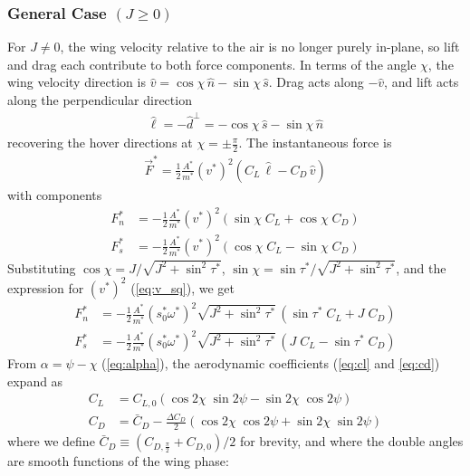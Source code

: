 \documentclass[11pt,letterpaper]{article}
\begin{document}
\subsubsection{General Case $(J \geq 0)$}

For $J \neq 0$, the wing velocity relative to the air is no longer
purely in-plane, so lift and drag each contribute to both force
components. In terms of the angle $\chi$, the wing velocity direction
is $\hat{v} = \cos\chi\, \hat{n} - \sin\chi\, \hat{s}$. Drag acts
along $-\hat{v}$, and lift acts along the perpendicular direction
\begin{align}
    \hat{\ell} = -\hat{d}^\perp = -\cos\chi\, \hat{s} - \sin\chi\, \hat{n}
\end{align}
recovering the hover directions at $\chi = \pm\frac{\pi}{2}$.
The instantaneous force is
\begin{align}
    \vec{F}^* = \frac12 \frac{A^*}{m^*} (v^*)^2 \left( C_L\, \hat{\ell} - C_D\, \hat{v} \right)
\end{align}
with components
\begin{align}
    F^*_n &= -\frac12 \frac{A^*}{m^*} (v^*)^2 \left( \sin\chi\; C_L + \cos\chi\; C_D \right) \\
    F^*_s &= -\frac12 \frac{A^*}{m^*} (v^*)^2 \left( \cos\chi\; C_L - \sin\chi\; C_D \right)
\end{align}
Substituting $\cos\chi = J/\sqrt{J^2 + \sin^2\tau^*}$,
$\sin\chi = \sin\tau^*/\sqrt{J^2 + \sin^2\tau^*}$, and the expression
for $(v^*)^2$ (\autoref{eq:v_sq}), we get
\begin{align}
    F^*_n &= -\frac12 \frac{A^*}{m^*} \left( s_0^* \omega^* \right)^2 \sqrt{J^2 + \sin^2\tau^*}\, \left( \sin\tau^*\; C_L + J\; C_D \right) \\
    F^*_s &= -\frac12 \frac{A^*}{m^*} \left( s_0^* \omega^* \right)^2 \sqrt{J^2 + \sin^2\tau^*}\, \left( J\; C_L - \sin\tau^*\; C_D \right)
\end{align}
From $\alpha = \psi - \chi$ (\autoref{eq:alpha}), the aerodynamic
coefficients (\autoref{eq:cl} and \autoref{eq:cd}) expand as
\begin{align}
    C_L &= C_{L,0} \left( \cos2\chi\; \sin2\psi - \sin2\chi\; \cos2\psi \right) \\
    C_D &= \bar{C}_D - \frac{\Delta C_D}{2} \left( \cos2\chi\; \cos2\psi + \sin2\chi\; \sin2\psi \right)
\end{align}
where we define $\bar{C}_D \equiv \left( C_{D,\frac\pi2} + C_{D,0} \right)/2$
for brevity, and where the double angles are smooth functions of
the wing phase:
\end{document}
